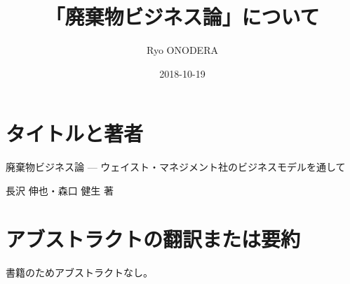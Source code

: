 \documentclass[a4j]{jsarticle}
\title{「廃棄物ビジネス論」について}
\author[1]{Ryo ONODERA}
\affil[1]{tetera.org}
\date{2018-10-19}
\begin{document}

\maketitle


\section{タイトルと著者}
廃棄物ビジネス論 --- ウェイスト・マネジメント社のビジネスモデルを通して
~\cite{haikibutsu-business-ron-nagasawa}

長沢 伸也・森口 健生 著

\section{アブストラクトの翻訳または要約}
書籍のためアブストラクトなし。
\end{document}
